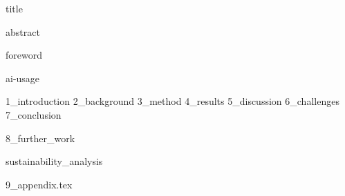 \documentclass{article}
\begin{document}
{title}

\frontmatter
\newpage
{abstract}

\newpage
{foreword}


\newpage
\tableofcontents

\listoffigures
\listoftables

\newpage
{ai-usage}

\mainmatter

\newpage
{1_introduction}
\newpage
{2_background}
\newpage
{3_method}
\newpage
{4_results}
\newpage
{5_discussion}
\newpage
{6_challenges}
\newpage
{7_conclusion}

\newpage
{8_further_work}

\appendix
\newpage
{sustainability_analysis}

\newpage
{9_appendix.tex}
\newpage



\end{document}
